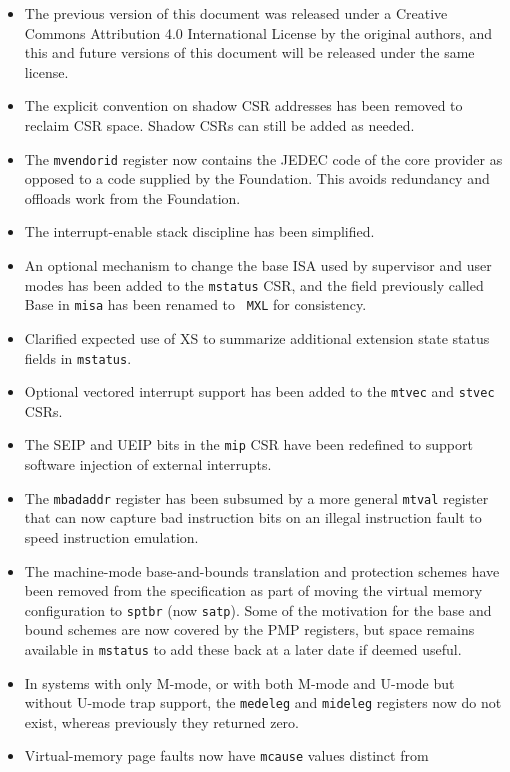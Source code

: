 \begin{itemize}
  \parskip 0pt
  \itemsep 1pt
\item The previous version of this document was released under a
  Creative Commons Attribution 4.0 International License by the
  original authors, and this and future versions of this document will
  be released under the same license.
\item The explicit convention on shadow CSR addresses has been removed
  to reclaim CSR space.  Shadow CSRs can still be added as needed.
\item The {\tt mvendorid} register now contains the JEDEC code of the
  core provider as opposed to a code supplied by the Foundation.  This
  avoids redundancy and offloads work from the Foundation.
\item The interrupt-enable stack discipline has been simplified.
\item An optional mechanism to change the base ISA used by supervisor
  and user modes has been added to the {\tt mstatus} CSR, and the
  field previously called Base in {\tt misa} has been renamed to {\tt
    MXL} for consistency.
\item Clarified expected use of XS to summarize additional extension
  state status fields in {\tt mstatus}.
\item Optional vectored interrupt support has been added to the
  {\tt mtvec} and {\tt stvec} CSRs.
\item The SEIP and UEIP bits in the {\tt mip} CSR have been redefined
  to support software injection of external interrupts.
  \item The {\tt mbadaddr} register has been subsumed by a more
    general {\tt mtval} register that can now capture bad
    instruction bits on an illegal instruction fault to speed
    instruction emulation.
\item The machine-mode base-and-bounds translation and protection
  schemes have been removed from the specification as part of moving
  the virtual memory configuration to {\tt sptbr} (now {\tt satp}).  Some of the
  motivation for the base and bound schemes are now covered by the PMP
  registers, but space remains available in {\tt mstatus} to add these
  back at a later date if deemed useful.
\item In systems with only M-mode, or with both M-mode and U-mode but
  without U-mode trap support, the {\tt medeleg} and {\tt mideleg}
    registers now do not exist, whereas previously they returned zero.
\item Virtual-memory page faults now have {\tt mcause} values distinct from

\end{itemize}
